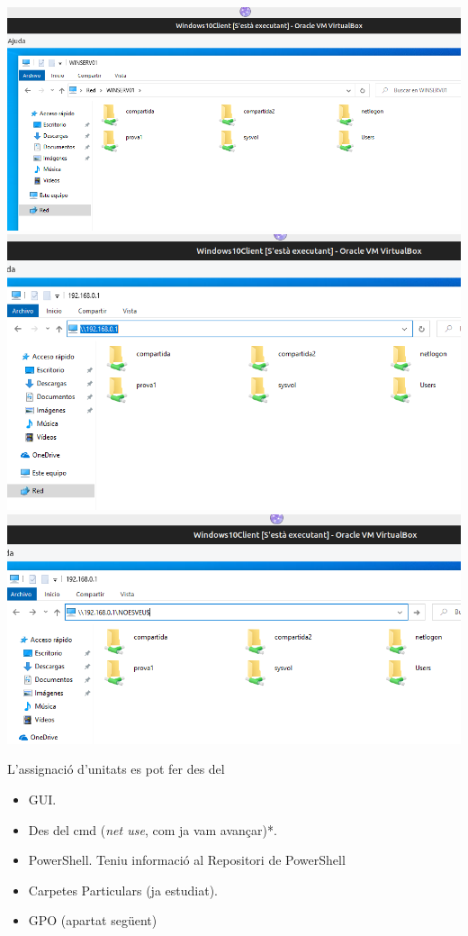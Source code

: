 \documentclass[
  a4paper,
]{article}
\providecommand{\tightlist}{%
  \setlength{\itemsep}{0pt}\setlength{\parskip}{0pt}}
\begin{document}
\includegraphics{png/CarpetesCompartidesDesdeWin10.png}
\includegraphics{png/CarpetesCompartidesDesdeWin10IP.png}
\includegraphics{png/CarpetesCompartidesOcultesDesdeWin10.png}

L'assignació d'unitats es pot fer des del

\begin{itemize}
\tightlist
\item
  GUI.
\item
  Des del cmd (\emph{net use}, com ja vam avançar)*.
\item
  PowerShell. Teniu informació al Repositori de PowerShell
\item
  Carpetes Particulars (ja estudiat).
\item
  GPO (apartat següent)
\end{itemize}
\end{document}
